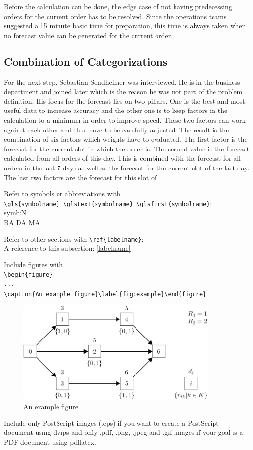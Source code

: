 Before the calculation can be done, the edge case of not having predecessing orders for the current order has to be resolved. Since the operations teams suggested a 15 minute basic time for preparation, this time is always taken when no forecast value can be generated for the current order.
\subsection{Combination of Categorizations}\label{subsection:Categorizing by Order}
For the next step, Sebastian Sondheimer was interviewed. He is in the business department and joined later which is the reason he was not part of the problem definition. His focus for the forecast lies on two pillars. One is the best and most useful data to increase accuracy and the other one is to keep factors in the calculation to a minimum in order to improve speed. These two factors can work against each other and thus have to be carefully adjusted. The result is the combination of six factors which weights have to evaluated. The first factor is the forecast for the current slot in which the order is. The second value is the forecast calculated from all orders of this day. This is combined with the forecast for all orders in the last 7 days as well as the forecast for the current slot of the last day. The last two factors are the forecast for this slot of


Refer to symbols or abbreviations with\\\verb+\gls{symbolname} \glstext{symbolname} \glsfirst{symbolname}+:\\
\gls{symb:N}  \\
\gls{BA} \gls{DA} \gls{MA}

Refer to other sections with \verb+\ref{labelname}+:\\
A reference to this subsection: \ref{labelname}

Include figures with\\
\verb+\begin{figure}+\\
\verb+...+\\
\verb+\caption{An example figure}\label{fig:example}\end{figure}+

\begin{figure}[h]
\begin{center}
\includegraphics[width=10cm]{images/example_figure}
\caption{An example figure}
\label{fig:example}
\end{center}
\end{figure}

Include only PostScript images (.eps) if you want to create a PostScript document using dvips and only .pdf, .png, .jpeg and .gif images if your goal is a PDF document using pdflatex.

